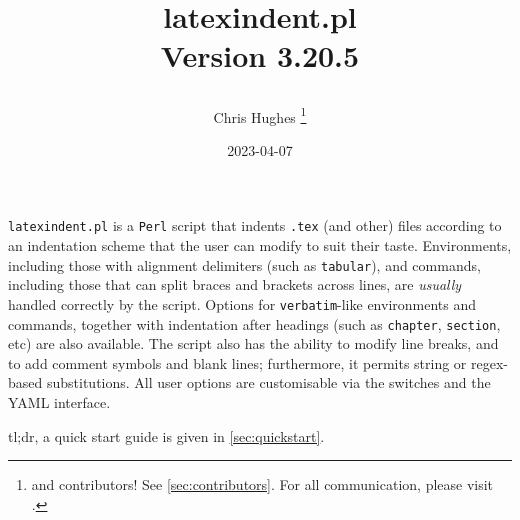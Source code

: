\title{%
	\begin{tcolorbox}[
			width=5.2cm,
			boxrule=0pt,
			colframe=white!40!black,
			colback=white,
			rightrule=2pt,
			sharp corners,
			enhanced,
			overlay={\node[anchor=north east,outer sep=2pt] at ([xshift=3cm,yshift=4mm]frame.north east) {\texttt{[image: logo]}}; }]
		\centering\ttfamily\bfseries latexindent.pl\\[1cm] Version 3.20.5
	\end{tcolorbox}
}
\author{Chris Hughes \thanks{and contributors!
		See \vref{sec:contributors}.
		For
		all communication, please visit \cite{latexindent-home}.}}
\date{2023-04-07}
\maketitle
\begin{adjustwidth}{1cm}{1cm}
	\small
	\texttt{latexindent.pl} is a \texttt{Perl} script that indents \texttt{.tex} (and other) files according to an indentation scheme that the user can modify to suit their taste.
	Environments, including those with alignment delimiters (such as \texttt{tabular}), and commands, including those that can split braces and brackets across lines, are \emph{usually} handled correctly by the script.
	Options for \texttt{verbatim}-like environments and commands, together with indentation after headings (such as \lstinline!chapter!, \lstinline!section!, etc) are also available.
	The script also has the ability to modify line breaks, and to add comment symbols and blank lines; furthermore, it permits string or
	regex-based substitutions.
	All user options are customisable via the switches and the YAML interface. 

    tl;dr, a quick start guide is given in \vref{sec:quickstart}.
\end{adjustwidth}
